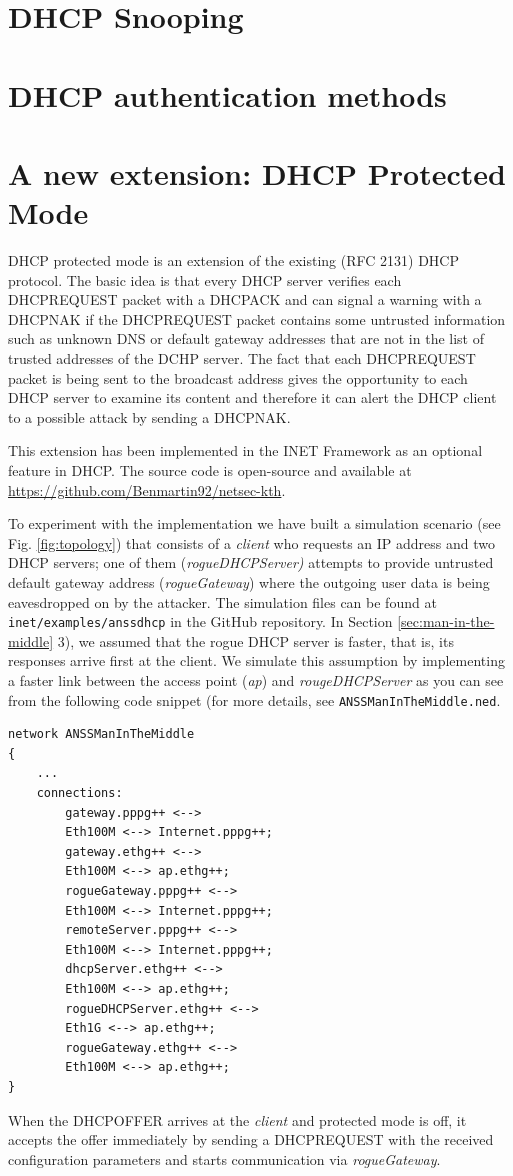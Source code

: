 \documentclass[letterpaper, 10 pt, conference]{ieeeconf}  %
\begin{document}
\section{DHCP Snooping}\label{sec:dhcp-snooping}
\section{DHCP authentication methods}\label{sec:auth}
\section{A new extension: DHCP Protected Mode}\label{sec:protected-mode}
DHCP protected mode is an extension of the existing (RFC 2131) DHCP protocol. The basic idea is that every DHCP server verifies each DHCPREQUEST packet with a DHCPACK and can signal a warning with a DHCPNAK if the DHCPREQUEST packet contains some untrusted information such as unknown DNS or default gateway addresses that are not in the list of trusted addresses of the DCHP server. The fact that each DHCPREQUEST packet is being sent to the broadcast address gives the opportunity to each DHCP server to examine its content and therefore it can alert the DHCP client to a possible attack by sending a DHCPNAK.

This extension has been implemented in the INET Framework as an optional feature in DHCP. The source code is open-source and available at \url{https://github.com/Benmartin92/netsec-kth}.

To experiment with the implementation we have built a simulation scenario (see Fig. \ref{fig:topology}) that consists of a \textit{client} who requests an IP address and two DHCP servers; one of them (\textit{rogueDHCPServer)} attempts to provide untrusted default gateway address (\textit{rogueGateway}) where the outgoing user data is being eavesdropped on by the attacker. The simulation files can be found at \texttt{inet/examples/anssdhcp} in the GitHub repository. In Section \ref{sec:man-in-the-middle} 3), we assumed that the rogue DHCP server is faster, that is, its responses arrive first at the client. We simulate this assumption by implementing a faster link between the access point (\textit{ap}) and \textit{rougeDHCPServer} as you can see from the following code snippet (for more details, see \texttt{ANSSManInTheMiddle.ned}.
\begin{verbatim}
network ANSSManInTheMiddle
{
	...
    connections:
        gateway.pppg++ <--> 
        Eth100M <--> Internet.pppg++;
        gateway.ethg++ <--> 
        Eth100M <--> ap.ethg++;
        rogueGateway.pppg++ <--> 
        Eth100M <--> Internet.pppg++;
        remoteServer.pppg++ <--> 
        Eth100M <--> Internet.pppg++;
        dhcpServer.ethg++ <--> 
        Eth100M <--> ap.ethg++;
        rogueDHCPServer.ethg++ <--> 
        Eth1G <--> ap.ethg++;
        rogueGateway.ethg++ <--> 
        Eth100M <--> ap.ethg++;
}
\end{verbatim}
When the DHCPOFFER arrives at the \textit{client} and protected mode is off, it accepts the offer immediately by sending a DHCPREQUEST with the received configuration parameters and starts communication via \textit{rogueGateway}.
\end{document}
